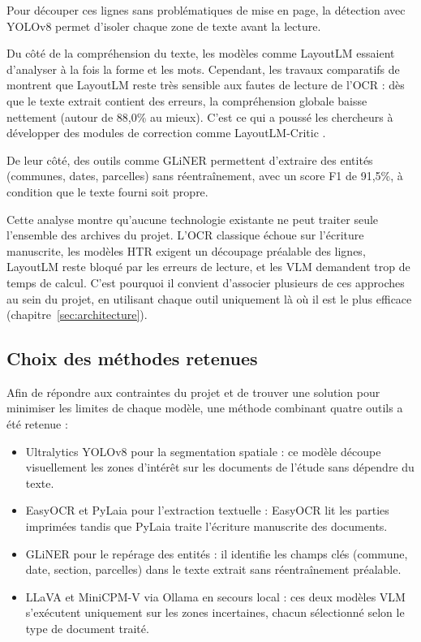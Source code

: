 Pour découper ces lignes sans problématiques de mise en page, la détection avec YOLOv8 \citep{redmon_yolo_2016, jiang_review_2022} permet d'isoler chaque zone de texte avant la lecture.


Du côté de la compréhension du texte, les modèles comme LayoutLM \citep{xu_layoutlm_2020} essaient d'analyser à la fois la forme et les mots. Cependant, les travaux comparatifs de \citet{bajrami_comprehensive_2023} montrent que LayoutLM reste très sensible aux fautes de lecture de l'OCR : dès que le texte extrait contient des erreurs, la compréhension globale baisse nettement (autour de 88,0\% au mieux). C'est ce qui a poussé les chercheurs à développer des modules de correction comme LayoutLM-Critic \citep{xu_layoutlm-critic_2022}.

De leur côté, des outils comme GLiNER permettent d'extraire des entités (communes, dates, parcelles) sans réentraînement, avec un score F1 de 91,5\%, à condition que le texte fourni soit propre.

Cette analyse montre qu'aucune technologie existante ne peut traiter seule l'ensemble des archives du projet. L'OCR classique échoue sur l'écriture manuscrite, les modèles HTR exigent un découpage préalable des lignes, LayoutLM reste bloqué par les erreurs de lecture, et les VLM demandent trop de temps de calcul. C'est pourquoi il convient d'associer plusieurs de ces approches au sein du projet, en utilisant chaque outil uniquement là où il est le plus efficace (chapitre~\ref{sec:architecture}).


\subsection{Choix des méthodes retenues}

Afin de répondre aux contraintes du projet et de trouver une solution pour minimiser les limites de chaque modèle, une méthode combinant quatre outils a été retenue :

\begin{itemize}
  \item Ultralytics YOLOv8 pour la segmentation spatiale : ce modèle découpe visuellement les zones d'intérêt sur les documents de l'étude sans dépendre du texte.
  \item EasyOCR et PyLaia pour l'extraction textuelle : EasyOCR lit les parties imprimées tandis que PyLaia traite l'écriture manuscrite des documents.
  \item GLiNER pour le repérage des entités : il identifie les champs clés (commune, date, section, parcelles) dans le texte extrait sans réentraînement préalable.
  \item LLaVA et MiniCPM-V via Ollama en secours local : ces deux modèles VLM s'exécutent uniquement sur les zones incertaines, chacun sélectionné selon le type de document traité.
\end{itemize}

